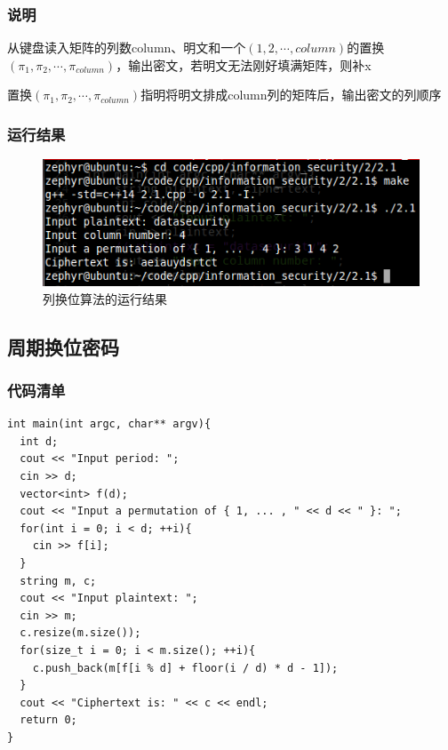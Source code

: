 \documentclass[11pt]{article}
\begin{document}
\subsubsection{说明}
从键盘读入矩阵的列数column、明文和一个$(1, 2, \cdots , column)$的置换$(\pi_1, \pi_2, \cdots, \pi_{column})$，输出密文，若明文无法刚好填满矩阵，则补x

置换$(\pi_1, \pi_2, \cdots, \pi_{column})$指明将明文排成column列的矩阵后，输出密文的列顺序

\subsubsection{运行结果}
\begin{center}
\begin{figure}[htbp]
\includegraphics[width=\textwidth]{2.1.png}
\caption{列换位算法的运行结果}
\label{fig: rlt2}
\end{figure}
\end{center}

\subsection{周期换位密码}
\subsubsection{代码清单}
\begin{center}
\begin{lstlisting}[caption = {周期换位密码的C++实现}, label = {lst: code3}]
int main(int argc, char** argv){
  int d;
  cout << "Input period: ";
  cin >> d;
  vector<int> f(d);
  cout << "Input a permutation of { 1, ... , " << d << " }: ";
  for(int i = 0; i < d; ++i){
    cin >> f[i];
  }
  string m, c;
  cout << "Input plaintext: ";
  cin >> m;
  c.resize(m.size());
  for(size_t i = 0; i < m.size(); ++i){
    c.push_back(m[f[i % d] + floor(i / d) * d - 1]);
  }
  cout << "Ciphertext is: " << c << endl;
  return 0;
}
\end{lstlisting}
\end{center}
\end{document}
